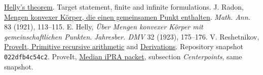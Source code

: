 \documentclass[11pt,letterpaper]{article}
\newcommand{\repo}{https://github.com/VladimirReshetnikov/ProveIt}
\newcommand{\pin}{022dfb4c54c22782f927a903f25bcf6491b7eba2}
\newcommand{\basepath}{Logic/PrimitiveRecursiveArithmetic}
\newcommand{\gh}[2]{\href{\repo/blob/\pin/\basepath/#1}{#2}}
\theoremstyle{packet}\newtheorem{theorem}{Theorem}\newtheorem{lem}[theorem]{Lemma}
\begin{document}
\begin{thebibliography}{9}\small
{} \href{https://en.wikipedia.org/wiki/Helly\%27s_theorem}{Helly's theorem}. Target statement, finite and infinite formulations.
 J. Radon, \href{https://doi.org/10.1007/BF01464231}{Mengen konvexer K\"orper, die einen gemeinsamen Punkt enthalten}. \emph{Math. Ann.} 83 (1921), 113--115. E. Helly, \emph{\"Uber Mengen konvexer K\"orper mit gemeinschaftlichen Punkten}. \emph{Jahresber. DMV} 32 (1923), 175--176.
 V. Reshetnikov, \gh{README.md}{ProveIt, Primitive recursive arithmetic} and \gh{Derivations/README.md}{Derivations}. Repository snapshot \texttt{022dfb4c54c2}.
 ProveIt, \gh{docs/proofs/probability/median_ipra_constructive_proofs/paper/median_ipra.tex}{Median iPRA packet}, subsection \emph{Centerpoints}, same snapshot.
\end{thebibliography}
\end{document}
